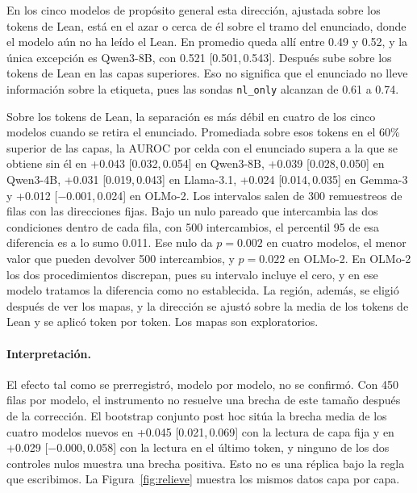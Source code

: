 \documentclass[10pt]{article}
\newcommand{\vr}[1]{\texttt{#1}}
\newcommand{\ic}[2]{[#1,\,#2]}
\begin{document}
En los cinco modelos de propósito general esta dirección, ajustada sobre los tokens de Lean, está en el azar o cerca
de él sobre el tramo del enunciado, donde el modelo aún no ha leído el Lean. En promedio queda allí entre 0.49 y
0.52, y la única excepción es Qwen3-8B, con 0.521 \ic{0.501}{0.543}. Después sube sobre los tokens de Lean en las
capas superiores. Eso no significa que el enunciado no lleve información sobre la etiqueta, pues las sondas
\vr{nl\_only} alcanzan de 0.61 a 0.74.

Sobre los tokens de Lean, la separación es más débil en cuatro de los cinco modelos cuando se retira el enunciado.
Promediada sobre esos tokens en el 60\% superior de las capas, la AUROC por celda con el enunciado supera a la que
se obtiene sin él en +0.043 \ic{0.032}{0.054} en Qwen3-8B, +0.039 \ic{0.028}{0.050} en Qwen3-4B, +0.031
\ic{0.019}{0.043} en Llama-3.1, +0.024 \ic{0.014}{0.035} en Gemma-3 y +0.012 \ic{−0.001}{0.024} en OLMo-2. Los
intervalos salen de 300 remuestreos de filas con las direcciones fijas. Bajo un nulo pareado que intercambia las
dos condiciones dentro de cada fila, con 500 intercambios, el percentil 95 de esa diferencia es a lo sumo 0.011.
Ese nulo da $p = 0.002$ en cuatro modelos, el menor valor que pueden devolver 500 intercambios, y $p = 0.022$ en
OLMo-2. En OLMo-2 los dos procedimientos discrepan, pues su intervalo incluye el cero, y en ese modelo tratamos la
diferencia como no establecida. La región, además, se eligió después de ver los mapas, y la dirección se ajustó
sobre la media de los tokens de Lean y se aplicó token por token. Los mapas son exploratorios.

\paragraph{Interpretación.}
El efecto tal como se prerregistró, modelo por modelo, no se confirmó. Con 450 filas por modelo, el instrumento no
resuelve una brecha de este tamaño después de la corrección. El bootstrap conjunto post hoc sitúa la brecha media
de los cuatro modelos nuevos en +0.045 \ic{0.021}{0.069} con la lectura de capa fija y en +0.029
\ic{−0.000}{0.058} con la lectura en el último token, y ninguno de los dos controles nulos muestra una brecha
positiva. Esto no es una réplica bajo la regla que escribimos.
La Figura~\ref{fig:relieve} muestra los mismos datos capa por capa.
\end{document}
